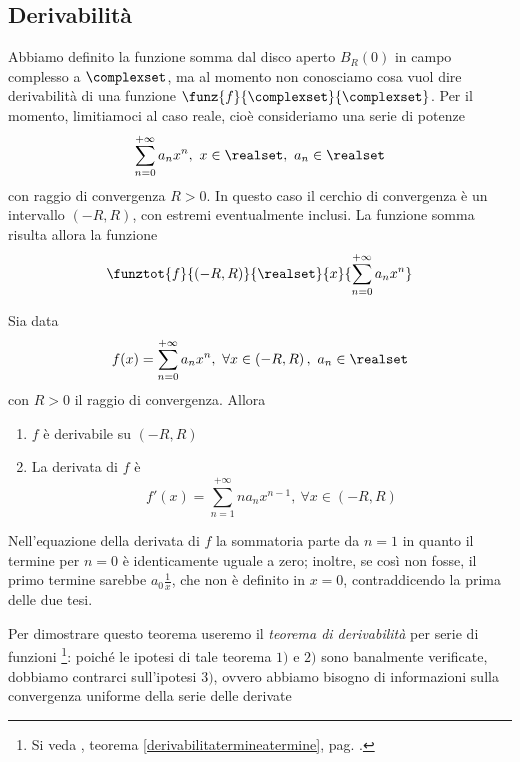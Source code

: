 \subsection{Derivabilità}
Abbiamo definito la funzione somma dal disco aperto $B_R\left(0\right)$ in campo complesso a $\complexset$, ma al momento non conosciamo cosa vuol dire derivabilità di una funzione $\funz{f}{\complexset}{\complexset}$. Per il momento, limitiamoci al caso reale, cioè consideriamo una serie di potenze
\begin{equation*}
	\sum_{n=0}^{+\infty}a_nx^n,\ x\in\realset,\ a_n\in\realset
\end{equation*}
con raggio di convergenza $R>0$. In questo caso il cerchio di convergenza è un intervallo $\left(-R,R\right)$, con estremi eventualmente inclusi. La funzione somma risulta allora la funzione
\begin{equation}
	\funztot{f}{\left(-R,R\right)}{\realset}{x}{\displaystyle\sum_{n=0}^{+\infty}a_nx^n}
\end{equation}
\begin{theorema}
	Sia data
	\begin{equation*}
		f(x)=\sum_{n=0}^{+\infty}a_nx^n,\ \forall x\in\left(-R,R\right),\ a_n\in\realset
	\end{equation*}
con $R>0$ il raggio di convergenza. Allora
\begin{enumerate}
	\item $f$ è derivabile su $\left(-R,R\right)$
	\item La derivata di $f$ è
	\begin{equation}
		f'(x)=\sum_{n=1}^{+\infty}na_nx^{n-1}, \ \forall x\in\left(-R,R\right)
	\end{equation}
\end{enumerate}
\end{theorema}
\begin{observe}
	Nell'equazione della derivata di $f$ la sommatoria parte da $n=1$ in quanto il termine per $n=0$ è identicamente uguale a zero; inoltre, se così non fosse, il primo termine sarebbe $a_0\frac{1}{x}$, che non è definito in $x=0$, contraddicendo la prima delle due tesi.
\end{observe}
Per dimostrare questo teorema useremo il \textit{teorema di derivabilità} per serie di funzioni \footnote{Si veda , teorema \ref{derivabilitatermineatermine}, pag. \pageref{derivabilitatermineatermine}.}: poiché le ipotesi di tale teorema $1)$ e $2)$ sono banalmente verificate, dobbiamo contrarci sull'ipotesi $3)$, ovvero abbiamo bisogno di informazioni sulla convergenza uniforme della serie delle derivate
